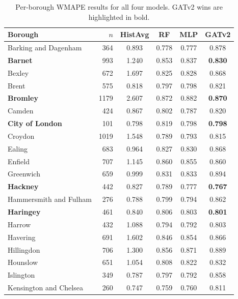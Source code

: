 \documentclass[12pt,a4paper]{report}
\begin{document}
\begin{table}[ht]
  \centering
  \caption{Per-borough WMAPE results for all four models.
           GATv2 wins are highlighted in bold.}
  \label{tab:borough}
  \small
  \begin{tabular}{lrcccc}
    \toprule
    Borough & $n$ & HistAvg & RF & MLP & GATv2 \\
    \midrule
    Barking and Dagenham   & 364  & 0.893 & 0.778 & 0.777 & 0.878 \\
    \textbf{Barnet}        & 993  & 1.240 & 0.853 & 0.837 & \textbf{0.830} \\
    Bexley                 & 672  & 1.697 & 0.825 & 0.828 & 0.868 \\
    Brent                  & 575  & 0.818 & 0.797 & 0.798 & 0.821 \\
    \textbf{Bromley}       & 1179 & 2.607 & 0.872 & 0.882 & \textbf{0.870} \\
    Camden                 & 424  & 0.867 & 0.802 & 0.787 & 0.820 \\
    \textbf{City of London}& 101  & 0.798 & 0.819 & 0.798 & \textbf{0.798} \\
    Croydon                & 1019 & 1.548 & 0.789 & 0.793 & 0.815 \\
    Ealing                 & 683  & 0.964 & 0.827 & 0.830 & 0.868 \\
    Enfield                & 707  & 1.145 & 0.860 & 0.855 & 0.860 \\
    Greenwich              & 659  & 0.999 & 0.831 & 0.833 & 0.894 \\
    \textbf{Hackney}       & 442  & 0.827 & 0.789 & 0.777 & \textbf{0.767} \\
    Hammersmith and Fulham & 276  & 0.788 & 0.799 & 0.794 & 0.862 \\
    \textbf{Haringey}      & 461  & 0.840 & 0.806 & 0.803 & \textbf{0.801} \\
    Harrow                 & 432  & 1.088 & 0.794 & 0.792 & 0.803 \\
    Havering               & 691  & 1.602 & 0.846 & 0.854 & 0.866 \\
    Hillingdon             & 706  & 1.300 & 0.856 & 0.871 & 0.889 \\
    Hounslow               & 651  & 1.054 & 0.808 & 0.822 & 0.832 \\
    Islington              & 349  & 0.787 & 0.797 & 0.792 & 0.858 \\
    Kensington and Chelsea & 260  & 0.747 & 0.759 & 0.760 & 0.811 \\

\end{tabular}
\end{table}
\end{document}
